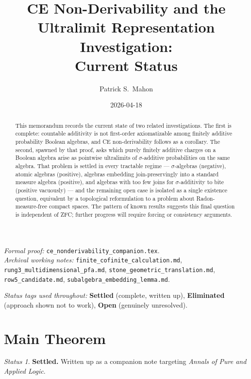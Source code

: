 \documentclass[11pt]{article}
\title{CE Non-Derivability and the Ultralimit Representation Investigation:\\
\large Current Status}
\author{Patrick S.\ Mahon}
\date{2026-04-18}
\theoremstyle{definition}
\theoremstyle{remark}
\newtheorem*{status}{Status}
\begin{document}
\maketitle

\begin{abstract}
This memorandum records the current state of two related investigations. The first
is complete: countable additivity is not first-order axiomatizable among finitely
additive probability Boolean algebras, and CE non-derivability follows as a
corollary. The second, spawned by that proof, asks which purely finitely additive
charges on a Boolean algebra arise as pointwise ultralimits of $\sigma$-additive
probabilities on the same algebra. That problem is settled in every tractable
regime — $\sigma$-algebras (negative), atomic algebras (positive), algebras embedding
join-preservingly into a standard measure algebra (positive), and algebras with too
few joins for $\sigma$-additivity to bite (positive vacuously) — and the remaining
open case is isolated as a single existence question, equivalent by a topological
reformulation to a problem about Radon-measure-free compact spaces. The pattern of
known results suggests this final question is independent of ZFC; further progress
will require forcing or consistency arguments.
\end{abstract}

\tableofcontents

\bigskip

\noindent\textit{Formal proof:} \texttt{ce\_nonderivability\_companion.tex}.\\
\textit{Archival working notes:} \texttt{finite\_cofinite\_calculation.md},
\texttt{rung3\_multidimensional\_pfa.md}, \texttt{stone\_geometric\_translation.md},
\texttt{row5\_candidate.md}, \texttt{subalgebra\_embedding\_lemma.md}.

\medskip\noindent\textit{Status tags used throughout:}
\textbf{Settled} (complete, written up),
\textbf{Eliminated} (approach shown not to work),
\textbf{Open} (genuinely unresolved).

\section{Main Theorem}

\begin{status}
\textbf{Settled.} Written up as a companion note targeting \textit{Annals of Pure
and Applied Logic}.
\end{status}
\end{document}
